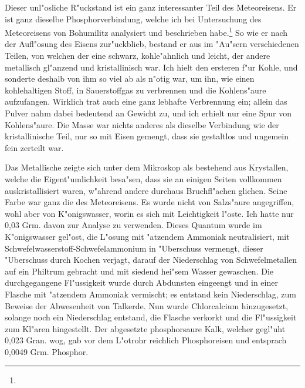 \documentclass[a4paper, 11pt, oneside]{article}
\begin{document}
Dieser unl"osliche R"uckstand ist ein ganz interessanter Teil des Meteoreisens. Er ist ganz dieselbe Phosphorverbindung, welche ich bei Untersuchung des Meteoreisens von Bohumilitz analysiert und beschrieben habe.\footnote{} So wie er nach der Aufl"osung des Eisens zur"uckblieb, bestand er aus im "Au"sern verschiedenen Teilen, von welchen der eine schwarz, kohle"ahnlich und leicht, der andere metallisch gl"anzend und kristallinisch war. Ich hielt den ersteren f"ur Kohle, und sonderte deshalb von ihm so viel ab als n"otig war, um ihn, wie einen kohlehaltigen Stoff, in Sauerstoffgas zu verbrennen und die Kohlens"aure aufzufangen. Wirklich trat auch eine ganz lebhafte Verbrennung ein; allein das Pulver nahm dabei bedeutend an Gewicht zu, und ich erhielt nur eine Spur von Kohlens"aure. Die Masse war nichts anderes als dieselbe Verbindung wie der kristallinische Teil, nur so mit Eisen gemengt, dass sie gestaltlos und ungemein fein zerteilt war.

Das Metallische zeigte sich unter dem Mikroskop als bestehend aus Krystallen, welche die Eigent"umlichkeit besa"sen, dass sie an einigen Seiten vollkommen auskristallisiert waren, w"ahrend andere durchaus Bruchfl"achen glichen. Seine Farbe war ganz die des Meteoreisens. Es wurde nicht von Salzs"aure angegriffen, wohl aber von K"onigswasser, worin es sich mit Leichtigkeit l"oste. Ich hatte nur 0,03 Grm. davon zur Analyse zu verwenden. Dieses Quantum wurde im K"onigswasser gel"ost, die L"osung mit "atzendem Ammoniak neutralisiert, mit Schwefelwasserstoff-Schwefelammonium in "Uberschuss vermengt, dieser "Uberschuss durch Kochen verjagt, darauf der Niederschlag von Schwefelmetallen auf ein Philtrum gebracht und mit siedend hei"sem Wasser gewaschen. Die durchgegangene Fl"ussigkeit wurde durch Abdunsten eingeengt und in einer Flasche mit "atzendem Ammoniak vermischt; es entstand kein Niederschlag, zum Beweise der Abwesenheit von Talkerde. Nun wurde Chlorcalcium hinzugesetzt, solange noch ein Niederschlag entstand, die Flasche verkorkt und die Fl"ussigkeit zum Kl"aren hingestellt. Der abgesetzte phosphorsaure Kalk, welcher gegl"uht 0,023 Gran. wog, gab vor dem L"otrohr reichlich Phosphoreisen und entsprach 0,0049 Grm. Phosphor.
\end{document}

